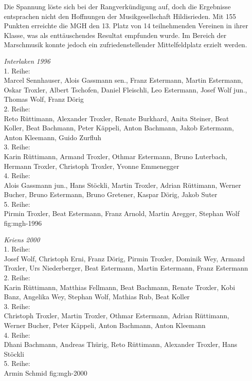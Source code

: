 \begin{history}
    Die Spannung löste sich bei der Rangverkündigung auf, doch die Ergebnisse
    entsprachen nicht den Hoffnungen der Musikgesellschaft Hildisrieden. Mit 155
    Punkten erreichte die MGH den 13. Platz von 14 teilnehmenden Vereinen in
    ihrer Klasse, was als enttäuschendes Resultat empfunden wurde. Im Bereich
    der Marschmusik konnte jedoch ein zufriedenstellender Mittelfeldplatz
    erzielt werden.

\end{history}

{\emph{Interlaken 1996}\\
    1. Reihe:\\
    Marcel Sennhauser, Alois Gassmann sen., Franz Estermann, Martin Estermann,
    Oskar Troxler, Albert Tschofen, Daniel Fleischli, Leo Estermann, Josef Wolf
    jun., Thomas Wolf, Franz Dörig\\
    2. Reihe:\\
    Reto Rüttimann, Alexander Troxler, Renate Burkhard, Anita Steiner, Beat
    Koller, Beat Bachmann, Peter Käppeli, Anton Bachmann, Jakob Estermann, Anton
    Kleemann, Guido Zurfluh\\
    3. Reihe:\\
    Karin Rüttimann, Armand Troxler, Othmar Estermann, Bruno Luterbach, Hermann
    Troxler, Christoph Troxler, Yvonne Emmenegger\\
    4. Reihe:\\
    Alois Gassmann jun., Hans Stöckli, Martin Troxler, Adrian Rüttimann, Werner
    Bucher, Bruno Estermann, Bruno Gretener, Kaspar Dörig, Jakob Suter\\
    5. Reihe:\\
    Pirmin Troxler, Beat Estermann, Franz Arnold, Martin Aregger, Stephan Wolf }
{fig:mgh-1996}




{\emph{Kriens 2000}\\
    1. Reihe:\\
    Josef Wolf, Christoph Erni, Franz Dörig, Pirmin Troxler, Dominik Wey, Armand
    Troxler, Urs Niederberger, Beat Estermann, Martin Estermann, Franz
    Estermann\\
    2. Reihe:\\
    Karin Rüttimann, Matthias Fellmann, Beat Bachmann, Renate Troxler, Kobi
    Banz, Angelika Wey, Stephan Wolf, Mathias Rub, Beat Koller\\
    3. Reihe:\\
    Christoph Troxler, Martin Troxler, Othmar Estermann, Adrian Rüttimann,
    Werner Bucher, Peter Käppeli, Anton Bachmann, Anton Kleemann\\
    4. Reihe:\\
    Dhani Bachmann, Andreas Thürig, Reto Rüttimann, Alexander Troxler, Hans
    Stöckli\\
    5. Reihe:\\
    Armin Schmid } {fig:mgh-2000}

